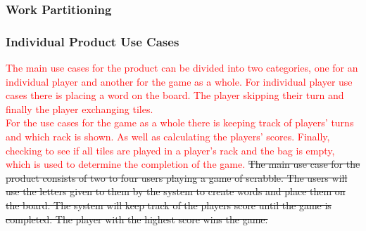 \documentclass[12pt, titlepage]{article}
\begin{document}
\subsubsection{Work Partitioning} %
%

\begin{table}[!htb]
    \centering
    \caption{Work Partitioning}
\end{table}

\subsubsection{Individual Product Use Cases}%
\textcolor{red}{The main use cases for the product can be divided into two categories, one for an individual player and another for the game as a whole. For individual player use cases there is placing a word on the board. The player skipping their turn and finally the player exchanging tiles.\\
For the use cases for the game as a whole there is  keeping track of players' turns and which rack is shown. As well as calculating the players' scores. Finally, checking to see if all tiles are played in a player's rack and the bag is empty, which is used to determine the completion of the game.}
\sout{The main use case for the product consists of two to four users playing a game of scrabble. The users will use the letters given to them by the system to create words and place them on the board. The system will keep track of the players score until the game is completed. The player with the highest score wins the game.}
\end{document}
